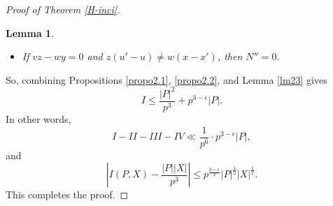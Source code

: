\documentclass[10pt,a4paper]{amsart}
\newtheorem{lemma}{Lemma}
\begin{document}
\begin{proof}[Proof of Theorem \ref{H-inci}]
\begin{lemma}
\begin{itemize}
\item If $vz-wy=0$ and $z(u'-u)\ne w(x-x')$, then $N''=0$.
\end{itemize}
\end{lemma}


So, combining Propositions \ref{propo2.1}, \ref{propo2.2}, and Lemma \ref{lm23} gives
\[I\le \frac{|P|^2}{p^3}+p^{3-\epsilon}|P|.\]
In other words,
\[I-II-III-IV\ll \frac{1}{p^6}\cdot p^{3-\epsilon}|P|,\]
and 
 \[\left\vert I(P, X)- \frac{|P||X|}{p^3} \right\vert\le p^{\frac{3-\epsilon}{2}}|P|^{\frac{1}{2}}|X|^{\frac{1}{2}}.\]
 This completes the proof.
\end{proof}
\end{document}
